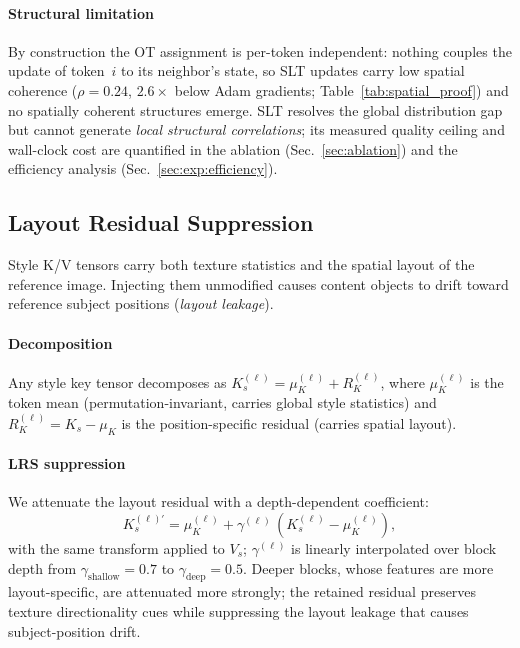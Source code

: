 \paragraph{Structural limitation}
By construction the OT assignment is per-token independent: nothing
couples the update of token~$i$ to its neighbor's state, so SLT updates carry
low spatial coherence ($\rho = 0.24$, $2.6\times$ below Adam gradients;
Table~\ref{tab:spatial_proof}) and no spatially coherent structures emerge.
SLT resolves the global distribution gap but cannot generate \emph{local
structural correlations}; its measured quality ceiling and wall-clock cost are
quantified in the ablation (Sec.~\ref{sec:ablation}) and the efficiency
analysis (Sec.~\ref{sec:exp:efficiency}).

\subsection{Layout Residual Suppression}
\label{sec:method:lrs}

Style K/V tensors carry both texture statistics and the spatial layout of the
reference image.
Injecting them unmodified causes content objects to drift toward reference
subject positions (\emph{layout leakage}).

\paragraph{Decomposition}
Any style key tensor decomposes as
$K_s^{(\ell)} = \mu_K^{(\ell)} + R_K^{(\ell)}$,
where $\mu_K^{(\ell)}$ is the token mean (permutation-invariant, carries
global style statistics) and $R_K^{(\ell)} = K_s - \mu_K$ is the
position-specific residual (carries spatial layout).

\paragraph{LRS suppression}
We attenuate the layout residual with a depth-dependent coefficient:
\begin{equation}
  K_s^{(\ell)\prime} = \mu_K^{(\ell)} + \gamma^{(\ell)}\,
                       (K_s^{(\ell)} - \mu_K^{(\ell)}),
  \label{eq:lrs}
\end{equation}
with the same transform applied to $V_s$; $\gamma^{(\ell)}$ is linearly
interpolated over block depth from $\gamma_\text{shallow}=0.7$ to
$\gamma_\text{deep}=0.5$.
Deeper blocks, whose features are more layout-specific, are attenuated more
strongly; the retained residual preserves texture directionality cues while
suppressing the layout leakage that causes subject-position drift.

